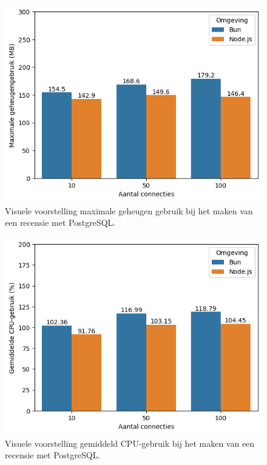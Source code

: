   \begin{figure}[H]
    \centering
    \includegraphics[width=0.7\columnwidth]{graphics/PostPostgresRAM.png}
    \caption[Geheugengebruik POST verzoek met PostgreSQL]{\label{fig:postgeheugenpostgres}Visuele voorstelling maximale geheugen gebruik bij het maken van een recensie met PostgreSQL.}
  \end{figure}
  \begin{figure}[H]
    \centering
    \includegraphics[width=0.7\columnwidth]{graphics/PostPostgresCpu.png}
    \caption[CPU-gebruik POST verzoek met PostgreSQL]{\label{fig:postcpupostgres}Visuele voorstelling gemiddeld CPU-gebruik bij het maken van een recensie met PostgreSQL.}
  \end{figure}

